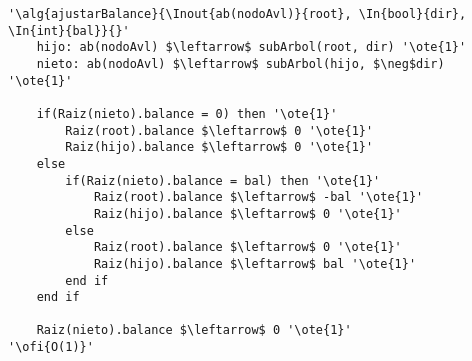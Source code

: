 \begin{lstlisting}[mathescape]
'\alg{ajustarBalance}{\Inout{ab(nodoAvl)}{root}, \In{bool}{dir}, \In{int}{bal}}{}'
	hijo: ab(nodoAvl) $\leftarrow$ subArbol(root, dir) '\ote{1}'
	nieto: ab(nodoAvl) $\leftarrow$ subArbol(hijo, $\neg$dir) '\ote{1}'

	if(Raiz(nieto).balance = 0) then '\ote{1}'
		Raiz(root).balance $\leftarrow$ 0 '\ote{1}'
		Raiz(hijo).balance $\leftarrow$ 0 '\ote{1}'
	else
		if(Raiz(nieto).balance = bal) then '\ote{1}'
			Raiz(root).balance $\leftarrow$ -bal '\ote{1}'
			Raiz(hijo).balance $\leftarrow$ 0 '\ote{1}'
		else
			Raiz(root).balance $\leftarrow$ 0 '\ote{1}'
			Raiz(hijo).balance $\leftarrow$ bal '\ote{1}'
		end if
	end if

	Raiz(nieto).balance $\leftarrow$ 0 '\ote{1}'
'\ofi{O(1)}'
\end{lstlisting}

